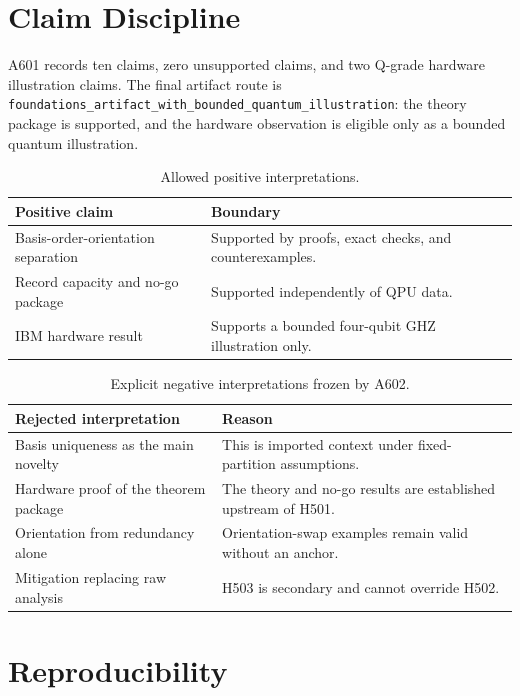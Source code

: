\documentclass[11pt]{article}
\begin{document}
\section{Claim Discipline}

A601 records ten claims, zero unsupported claims, and two Q-grade hardware
illustration claims.  The final artifact route is
\texttt{foundations\_artifact\_with\_bounded\_quantum\_illustration}: the
theory package is supported, and the hardware observation is eligible only as a
bounded quantum illustration.

\begin{table}[htbp]
\centering
\begin{tabularx}{\textwidth}{@{}P{0.2\textwidth}Y@{}}
\toprule
Positive claim & Boundary \\
\midrule
Basis-order-orientation separation &
Supported by proofs, exact checks, and counterexamples. \\
Record capacity and no-go package &
Supported independently of QPU data. \\
IBM hardware result &
Supports a bounded four-qubit GHZ illustration only. \\
\bottomrule
\end{tabularx}
\caption{Allowed positive interpretations.}
\end{table}

\begin{table}[htbp]
\centering
\begin{tabularx}{\textwidth}{@{}P{0.28\textwidth}Y@{}}
\toprule
Rejected interpretation & Reason \\
\midrule
Basis uniqueness as the main novelty &
This is imported context under fixed-partition assumptions. \\
Hardware proof of the theorem package &
The theory and no-go results are established upstream of H501. \\
Orientation from redundancy alone &
Orientation-swap examples remain valid without an anchor. \\
Mitigation replacing raw analysis &
H503 is secondary and cannot override H502. \\
\bottomrule
\end{tabularx}
\caption{Explicit negative interpretations frozen by A602.}
\end{table}

\section{Reproducibility}
\end{document}
